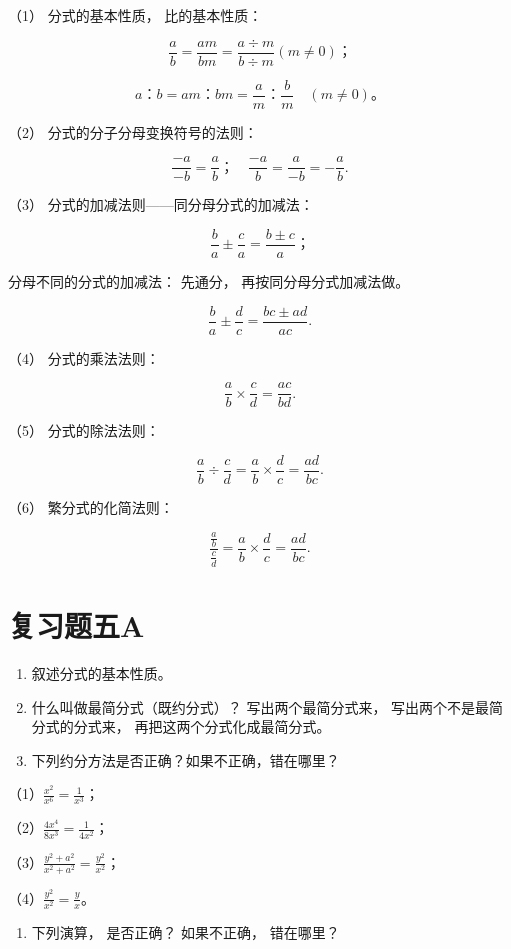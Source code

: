 （1） 分式的基本性质， 比的基本性质：

\[
\frac{a}{b} = \frac{a m}{b m} = \frac{a \div m}{b \div m} (m \neq 0)\text{；}
\]

\[
a\text{：} b = a m\text{：} b m = \frac{a}{m}\text{：} \frac{b}{m} \quad (m \neq 0)\text{。}
\]

（2） 分式的分子分母变换符号的法则：

\[
\frac{- a}{- b} = \frac{a}{b}\text{；} \quad \frac{- a}{b} = \frac{a}{- b} = - \frac{a}{b}.
\]

（3） 分式的加减法则------同分母分式的加减法：

\[
\frac{b}{a} \pm \frac{c}{a} = \frac{b \pm c}{a}\text{；}
\]

分母不同的分式的加减法： 先通分， 再按同分母分式加减法做。

\[
\frac{b}{a} \pm \frac{d}{c} = \frac{b c \pm a d}{a c}.
\]

（4） 分式的乘法法则：

\[
\frac{a}{b} \times \frac{c}{d} = \frac{a c}{b d}.
\]

（5） 分式的除法法则：

\[
\frac{a}{b} \div \frac{c}{d} = \frac{a}{b} \times \frac{d}{c} = \frac{a d}{b c}.
\]

（6） 繁分式的化简法则：

\[
\frac{\frac{a}{b}}{\frac{c}{d}} = \frac{a}{b} \times \frac{d}{c} = \frac{a d}{b c}.
\]

\section{复习题五A}

\begin{enumerate}
\item
  叙述分式的基本性质。
\item
  什么叫做最简分式（既约分式）？ 写出两个最简分式来，
  写出两个不是最简分式的分式来， 再把这两个分式化成最简分式。
\item
  下列约分方法是否正确？如果不正确，错在哪里？
\end{enumerate}

（1）\(\frac{x^2}{x^6} = \frac{1}{x^3}\)；

（2）\(\frac{4x^4}{8x^3} = \frac{1}{4x^2}\)；

（3）\(\frac{y^2 + a^2}{x^2 + a^2} = \frac{y^2}{x^2}\)；

（4）\(\frac{y^2}{x^2} = \frac{y}{x}\)。

\begin{enumerate}[start=4]
\item
  下列演算， 是否正确？ 如果不正确， 错在哪里？
\end{enumerate}

